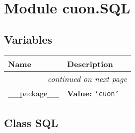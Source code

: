 %
%
%


\section{Module cuon.SQL}

    \label{cuon:SQL}


  \subsection{Variables}

    \vspace{-1cm}
\hspace{\varindent}\begin{longtable}{|p{\varnamewidth}|p{\vardescrwidth}|l}
\cline{1-2}
\cline{1-2} \centering \textbf{Name} & \centering \textbf{Description}& \\
\cline{1-2}
\endhead\cline{1-2}\multicolumn{3}{r}{\small\textit{continued on next page}}\\\endfoot\cline{1-2}
\endlastfoot\raggedright \_\-\_\-p\-a\-c\-k\-a\-g\-e\-\_\-\_\- & \raggedright \textbf{Value:} 
{\tt \texttt{'}\texttt{cuon}\texttt{'}}&\\
\cline{1-2}
\end{longtable}



\subsection{Class SQL}


